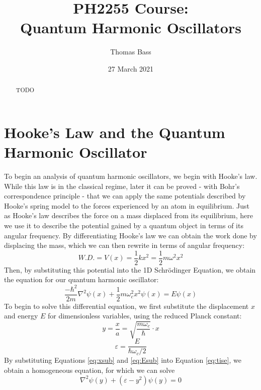 \documentclass[a4paper]{article}
\title{PH2255 Course:\\
Quantum Harmonic Oscillators}
\author{Thomas Bass}
\date{27 March 2021}
\begin{document}
\maketitle

\begin{abstract}
TODO
\end{abstract}

\section{Hooke's Law and the Quantum Harmonic Oscillator}
To begin an analysis of quantum harmonic oscillators, we begin with Hooke's law. While this law is in the classical regime, later it can be proved - with Bohr's correspondence principle - that we can apply the same potentials described by Hooke's spring model to the forces experienced by an atom in equilibrium. Just as Hooke's law describes the force on a mass displaced from its equilibrium, here we use it to describe the potential gained by a quantum object in terms of its angular frequency. By differentiating Hooke's law we can obtain the work done by displacing the mass, which we can then rewrite in terms of angular frequency:
\begin{equation} \label{eq:hooke}
W.D.=V(x)=\frac12kx^2=\frac12m\omega^2x^2
\end{equation}
Then, by substituting this potential into the 1D Schr\"odinger Equation, we obtain the equation for our quantum harmonic oscillator:
\begin{equation} \label{eq:tise}
\frac{-\hbar^2}{2m}\nabla^2\psi(x) + \frac12m\omega^2_cx^2\psi(x)=E\psi(x)
\end{equation}
To begin to solve this differential equation, we first substitute the displacement $x$ and energy $E$ for dimensionless variables, using the reduced Planck constant:
\begin{equation} \label{eq:xsub}
y=\frac xa=\sqrt{\frac{m\omega_c}\hbar}\cdot x
\end{equation}
\begin{equation} \label{eq:Esub}
\varepsilon=\frac E{\hbar\omega_c/2}
\end{equation}
By substituting Equations \ref{eq:xsub} and \ref{eq:Esub} into Equation \ref{eq:tise}, we obtain a homogeneous equation, for which we can solve
\begin{equation} \label{eq:tise_hom}
\nabla^2\psi(y)+(\varepsilon-y^2)\psi(y)=0
\end{equation} 
\end{document}
